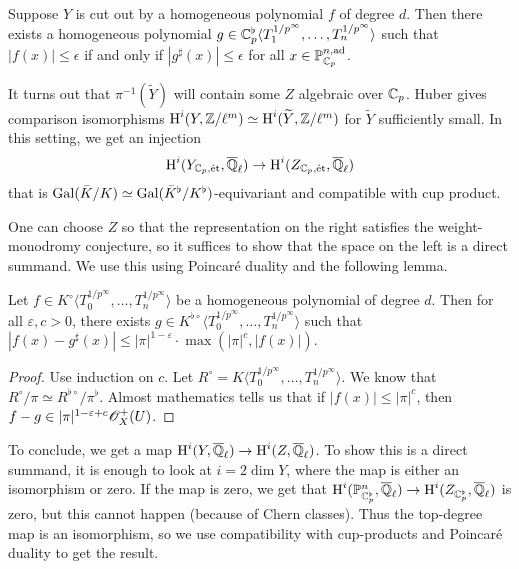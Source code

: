 \begin{lemma}
Suppose $Y$ is cut out by a homogeneous polynomial $f$ of degree $d$. Then 
there exists a homogeneous polynomial 
$g\in \mathbb{C}_p^\flat\langle T_1^{1/p^\infty},\dots,T_n^{1/p^\infty}\rangle$ such 
that $|f(x)|\leqslant \epsilon$ if and only if $|g^\sharp(x)|\leqslant \epsilon$ 
for all $x\in \mathbb{P}_{\mathbb{C}_p}^{n,\textnormal{ad}}$. 
\end{lemma}

It turns out that $\pi^{-1}(\widetilde Y)$ will contain some $Z$ algebraic 
over $\mathbb{C}_p$. Huber gives comparison isomorphisms 
$\operatorname{H}^i(Y,\mathbb{Z}/\ell^m)\simeq \operatorname{H}^i(\widetilde Y,\mathbb{Z}/\ell^m)$ for $\widetilde Y$ 
sufficiently small. In this setting, we get an injection   
\[
  \operatorname{H}^i(Y_{\mathbb{C}_p,\textnormal{\'et}},\overline{\mathbb{Q}}_\ell) \to \operatorname{H}^i(Z_{\mathbb{C}_p,\textnormal{\'et}},\overline{\mathbb{Q}}_\ell)
\]
that is $\operatorname{Gal}(\bar K/K)\simeq \operatorname{Gal}(\bar K^\flat/K^\flat)$-equivariant and 
compatible with cup product. 

One can choose $Z$ so that the representation on the right satisfies the 
weight-monodromy conjecture, so it suffices to show that the space on the left 
is a direct summand. We use this using Poincar\'e duality and the following 
lemma. 

\begin{lemma}
Let $f\in K^\circ\langle T_0^{1/p^\infty},\dots,T_n^{1/p^\infty}\rangle$ be a 
homogeneous polynomial of degree $d$. Then for all $\varepsilon,c>0$, there 
exists $g\in K^{\flat\circ}\langle T_0^{1/p^\infty},\dots,T_n^{1/p^\infty}\rangle$ 
such that $|f(x)-g^\sharp(x)|\leqslant |\pi|^{1-\varepsilon} \cdot \max(|\pi|^c,|f(x)|)$. 
\end{lemma}
\begin{proof}
Use induction on $c$. Let $R^\circ=K\langle T_0^{1/p^\infty},\dots,T_n^{1/p^\infty}\rangle$. 
We know that $R^\circ/\pi\simeq R^{\flat\circ}/\pi^\flat$. Almost mathematics tells 
us that if $|f(x)|\leqslant |\pi|^c$, then $f-g\in |\pi|^{1-\varepsilon+c} \mathscr{O}_X^+(U)$. 
\end{proof}

To conclude, we get a map $\operatorname{H}^i(Y,\overline{\mathbb{Q}}_\ell)\to \operatorname{H}^i(Z,\overline{\mathbb{Q}}_\ell)$. 
To show this is a direct summand, it is enough to look at $i=2\dim Y$, where the 
map is either an isomorphism or zero. If the map is zero, we get that 
$\operatorname{H}^i(\mathbb{P}_{\mathbb{C}_p^\flat}^n,\overline{\mathbb{Q}}_\ell) \to \operatorname{H}^i(Z_{\mathbb{C}_p^\flat},\overline{\mathbb{Q}}_\ell)$ 
is zero, but this cannot happen (because of Chern classes). Thus the top-degree 
map is an isomorphism, so we use compatibility with cup-products and Poincar\'e 
duality to get the result. 
